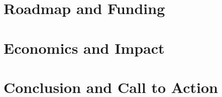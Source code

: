 \documentclass[10pt]{article}
\begin{document}
\begin{sloppypar}

  \section{Roadmap and Funding}
  \label{sec:next-years}

  \section{Economics and Impact}
  \label{sec:economics}

  \section{Conclusion and Call to Action}
  \label{sec:conclusion}


  \pagebreak
  
  
  \nocite{*}

\end{sloppypar}
\end{document}
